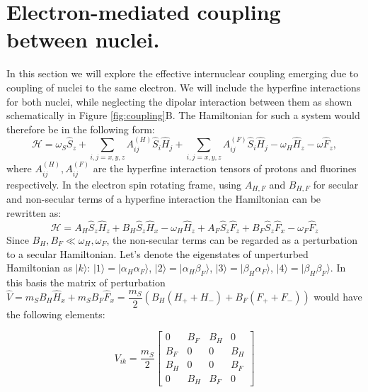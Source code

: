 \documentclass[a4paper, 12pt]{article}
\begin{document}
\section{Electron-mediated coupling between nuclei.}
In this section we will explore the effective internuclear coupling emerging due to coupling of nuclei to the same electron.
We will include the hyperfine interactions for both nuclei, while neglecting the dipolar interaction between them as shown schematically in Figure \ref{fig:coupling}B. The Hamiltonian for such a system would therefore be in the following form:
\begin{equation}
\mathcal{H} =  \omega_S \hat{S}_z + \sum_{i,j=x,y,z} A_{ij}^{(H)} \hat{S}_i \hat{H}_j +  \sum_{i,j=x,y,z} A_{ij}^{(F)} \hat{S}_i \hat{H}_j - \omega_H \hat{H}_z - \omega \hat{F}_z ,
\end{equation}
where $A_{ij}^{(H)}, A_{ij}^{(F)}$ are the hyperfine interaction tensors of protons and fluorines respectively. In the electron spin rotating frame, using $A_{H,F}$ and $B_{H,F}$ for secular and non-secular terms of a hyperfine interaction the Hamiltonian can be rewritten as:
\begin{equation}
\mathcal{H}  = A_H \hat{S}_z \hat{H}_z + B_H \hat{S}_z \hat{H}_x -  \omega_H \hat{H}_z + A_F \hat{S}_z \hat{F}_z + B_F \hat{S}_z \hat{F}_x - \omega_F \hat{F}_z
\end{equation}
Since $B_H, B_F \ll \omega_H, \omega_F $, the non-secular terms can be regarded as a perturbation to a secular Hamiltonian.
Let's denote the eigenstates of unperturbed Hamiltonian as $\vert k \rangle  $: $\vert 1 \rangle = \vert \alpha_H \alpha_F \rangle$, $\vert 2 \rangle =   \vert \alpha_H \beta_F \rangle$, $\vert 3 \rangle =   \vert \beta_H \alpha_F \rangle$, $\vert 4 \rangle =   \vert \beta_H \beta_F \rangle$. In this basis the matrix of perturbation $\hat{V} = m_S B_H \hat{H}_x + m_S B_F \hat{F}_x =\dfrac{m_S}{2} ( B_H (H_{+} + H_{-})  + B_F (F_{+} + F_{-})) $ would have the following elements:

\begin{equation}
	V_{ik} = \dfrac{m_S}{2} \begin{bmatrix}
	0 & B_F & B_H & 0 \\
	B_F & 0 & 0 & B_H \\
	B_H & 0 & 0 & B_F \\
	0 & B_H & B_F & 0 
	\end{bmatrix}
\end{equation}
\end{document}
